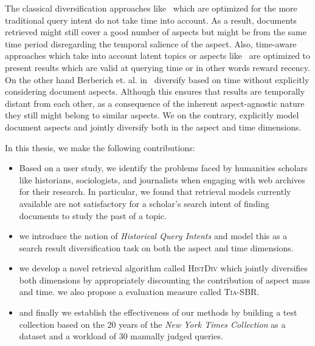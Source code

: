 The classical diversification approaches like~\cite{carbonell1998use,santos2010exploiting,agrawal_diversifying_2009,Carterette:2009:PMR:1645953.1646116,dang_diversity_2012} which are optimized for the more traditional query intent do not take time into account. As a result, documents retrieved might still cover a good number of aspects but might be from the same time period disregarding the temporal salience of the aspect. Also, time-aware approaches which take into account latent topics or aspects like~\cite{ecir/NguyenK14} are optimized to present results which are valid at querying time or in other words reward recency. On the other hand Berberich et. al. in~\cite{lm+t+d} diversify based on time without explicitly considering document aspects. Although this ensures that results are temporally distant from each other, as a consequence of the inherent aspect-agnostic nature they still might belong to similar aspects. We on the contrary, explicitly model document aspects and jointly diversify both in the aspect and time dimensions. 

In this thesis, we make the following contributions:

\begin{itemize}
	
	\item Based on a user study, we identify the problems faced by humanities scholars like historians, sociologists, and journalists when engaging with web archives for their research. In particular, we found that retrieval models currently available are not satisfactory for a scholar's search intent of finding documents to study the past of a topic.

 	\item we introduce the notion of \emph{Historical Query Intents} and model this as a search result diversification task on both the aspect and time dimensions.

 	\item we develop a novel retrieval algorithm called \textsc{HistDiv} which jointly diversifies both dimensions by appropriately discounting the contribution of aspect mass and time. we also propose a evaluation measure called \textsc{Tia-SBR}.

 	\item and finally we establish the effectiveness of our methods by building a test collection based on the 20 years of the \emph{New York Times Collection} as a dataset and a workload of 30 manually judged queries.
\end{itemize}

